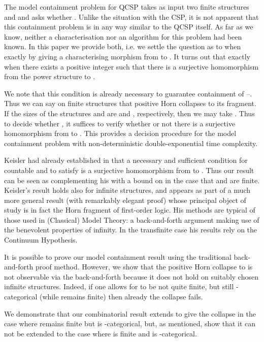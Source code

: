 \documentclass{LMCS}
\begin{document}
The model containment problem for QCSP takes as input two finite structures  and  and asks whether . Unlike the situation with the CSP, it is not apparent that this containment problem is in any way similar to the QCSP itself. As far as we know, neither a characterisation nor an algorithm for this problem had been known. In this paper we provide both, \mbox{i.e.} we settle the question as to when exactly  by giving a characterising morphism from  to .  It turns out that  exactly when there exists a positive integer  such that  there is a surjective homomorphism from the power structure  to . 

We note that this condition is already necessary to guarantee containment of --. Thus we can say on finite structures that positive Horn collapses to its  fragment. If the sizes of the structures  and  are  and , respectively, then we may take . Thus to decide whether , it suffices to verify whether or not there is a surjective homomorphism from  to . This provides a decision procedure for the model containment problem with non-deterministic double-exponential time complexity.

Keisler had already established in \cite{Keisler65} that a necessary and sufficient condition for countable  and  to satisfy   is a surjective homomorphism from  to . Thus our result can be seen as complementing his with a bound on  in the case that  and  are finite. Keisler's result holds also for infinite structures, and appears as part of a much more general result (with remarkably elegant proof) whose principal object of study is in fact the Horn fragment of first-order logic. His methods are typical of those used in (Classical) Model Theory: a back-and-forth argument making use of the benevolent properties of infinity. In the transfinite case his results rely on the Continuum Hypothesis.  

It is possible to prove our model containment result using the traditional back-and-forth proof method. However, we show that the positive Horn collapse to  is not observable via the back-and-forth because it does not hold on suitably chosen infinite structures. Indeed, if one allows for  to be not quite finite, but still -categorical (while  remains finite) then already the  collapse fails.


We demonstrate that our combinatorial result extends to give the  collapse in the case where  remains finite but  is -categorical, but, as mentioned, show that it can not be extended to the case where  is finite and  is -categorical. 
\end{document}
